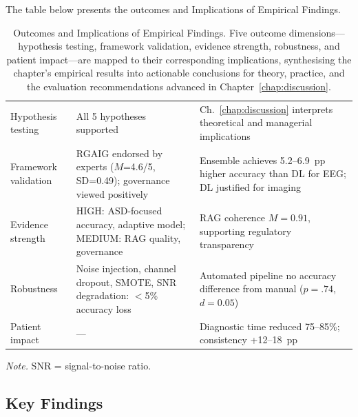 \noindent The table below presents the outcomes and Implications of Empirical Findings.

\begin{table}[!htbp]
\tablestripes\tablefontsize
\caption[Outcomes and Implications]{Outcomes and Implications of Empirical Findings. Five outcome dimensions---hypothesis testing, framework validation, evidence strength, robustness, and patient impact---are mapped to their corresponding implications, synthesising the chapter's empirical results into actionable conclusions for theory, practice, and the evaluation recommendations advanced in Chapter~\ref{chap:discussion}.}
\tablefontsize
\begin{tabularx}{\textwidth}{@{} >{\raggedright\arraybackslash}p{1.8cm} L L @{}}
\toprule
{} &  &  \\
\midrule
Hypothesis testing & All 5 hypotheses supported & Ch.~\ref{chap:discussion} interprets theoretical and managerial implications \\
\addlinespace
Framework validation & RGAIG endorsed by experts ($M$=4.6/5, SD=0.49); governance viewed positively & Ensemble achieves 5.2--6.9~pp higher accuracy than DL for EEG; DL justified for imaging \\
\addlinespace
Evidence strength & HIGH: ASD-focused accuracy, adaptive model; MEDIUM: RAG quality, governance & RAG coherence $M=0.91$, supporting regulatory transparency \\
\addlinespace
Robustness & Noise injection, channel dropout, SMOTE, SNR degradation: $<$5\% accuracy loss & Automated pipeline no accuracy difference from manual ($p=.74$, $d=0.05$) \\
\addlinespace
Patient impact & --- & Diagnostic time reduced 75--85\%; consistency +12--18~pp \\
\bottomrule
\end{tabularx}
\vspace{0.5em}\noindent\textit{Note.} SNR = signal-to-noise ratio.
\end{table}

\iffalse
\subsection{Key Findings}

